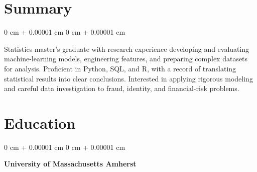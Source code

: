 \documentclass[10pt, letterpaper]{article}
\newenvironment{highlightsforbulletentries}{
    \begin{itemize}[
        topsep=0.10 cm,
        parsep=0.10 cm,
        partopsep=0pt,
        itemsep=0pt,
        leftmargin=10pt
    ]
}{
    \end{itemize}
} %
\newenvironment{onecolentry}{
    \begin{adjustwidth}{
        0 cm + 0.00001 cm
    }{
        0 cm + 0.00001 cm
    }
}{
    \end{adjustwidth}
} %
\begin{document}
    








    \section{Summary} 
        \begin{onecolentry}
         Statistics master's graduate with research experience developing and evaluating machine-learning models, engineering features, and preparing complex datasets for analysis. Proficient in Python, SQL, and R, with a record of translating statistical results into clear conclusions. Interested in applying rigorous modeling and careful data investigation to fraud, identity, and financial-risk problems.
        \end{onecolentry}
        
    \section{Education}

        \begin{onecolentry}
        \textbf{University of Massachusetts Amherst}
        \end{onecolentry}
        
\end{document}
